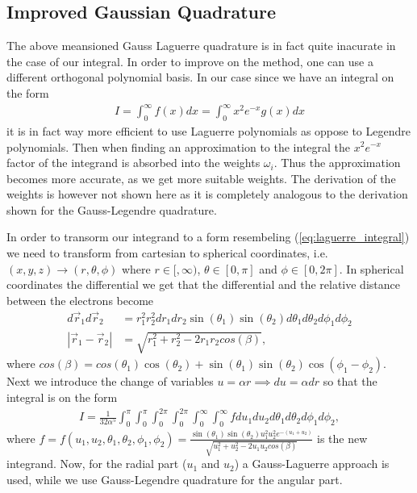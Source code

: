 \documentclass[twocolumn]{aastex62}
\begin{document}
\subsection{Improved Gaussian Quadrature}
The above meansioned Gauss Laguerre quadrature is in fact quite inacurate in the case of our integral. In order to improve on the method, one can use a different orthogonal polynomial basis. In our case since we have an integral on the form
\begin{align}
	I = \int^\infty_0 f(x)dx = \int^\infty_0x^2e^{-x}g(x) dx
	\label{eq:laguerre_integral}
\end{align}
it is in fact way more efficient to use Laguerre polynomials as oppose to Legendre polynomials. Then when finding an approximation to the integral the $x^2e^{-x}$ factor of the integrand is absorbed into the weights $\omega_i$. Thus the approximation becomes more accurate, as we get more suitable weights. The derivation of the weights is however not shown here as it is completely analogous to the derivation shown for the Gauss-Legendre quadrature.

In order to transorm our integrand to a form resembeling (\ref{eq:laguerre_integral}) we need to transform from cartesian to spherical coordinates, i.e. $(x, y, z)\to(r, \theta, \phi)$ where $r\in[,\infty)$, $\theta\in[0,\pi]$ and $\phi\in[0,2\pi]$. In spherical coordinates the differential we get that the differential and the relative distance between the electrons become 
\begin{align}
	d\vec{r}_1d\vec{r}_2 &= r_1^2r_2^2 dr_1dr_2\sin(\theta_1)\sin(\theta_2)d\theta_1d\theta_2d\phi_1d\phi_2\\
	|\vec{r}_1 - \vec{r}_2| &= \sqrt{r_1^2 + r_2^2 - 2r_1r_2cos(\beta)},
\end{align}
where $cos(\beta) = cos(\theta_1)\cos(\theta_2) + \sin(\theta_1)\sin(\theta_2)\cos(\phi_1 - \phi_2)$.
Next we introduce the change of variables $u = \alpha r \implies du = \alpha dr$ so that the integral is on the form
\begin{align}
	I = \frac{1}{32 \alpha^5} \int^\pi_0\int^{\pi}_0\int^{2\pi}_0\int^{2\pi}_0\int^\infty_0\int^\infty_0 fdu_1du_2d\theta_1d\theta_2d\phi_1d\phi_2,
\end{align}
where $f = f(u_1, u_2, \theta_1, \theta_2, \phi_1, \phi_2) = \frac{\sin
	(\theta_1)\sin(\theta_2)u_1^2u_2^2e^{-(u_1+u_2)}}{\sqrt{u_1^2 + u_2^2 - 2u_1u_2cos(\beta)}}$ is the new integrand.
Now, for the radial part ($u_1$ and $u_2$) a Gauss-Laguerre approach is used, while we use Gauss-Legendre quadrature for the angular part. 
\end{document}
